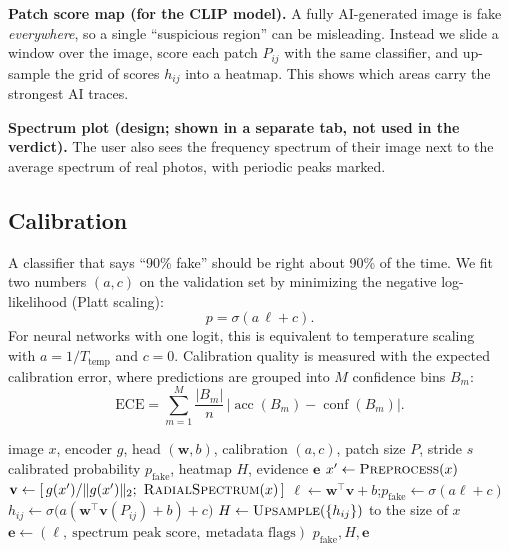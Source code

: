 \documentclass[11pt,a4paper]{article}
\begin{document}
\textbf{Patch score map (for the CLIP model).} A fully AI-generated image is fake
\emph{everywhere}, so a single ``suspicious region'' can be misleading. Instead we slide a window
over the image, score each patch $P_{ij}$ with the same classifier, and up-sample the grid of
scores $h_{ij}$ into a heatmap. This shows which areas carry the strongest AI traces.

\textbf{Spectrum plot (design; shown in a separate tab, not used in the verdict).} The user also sees the frequency spectrum of their image next to the
average spectrum of real photos, with periodic peaks marked.

\subsection{Calibration}
\label{sec:calibration}
A classifier that says ``90\% fake'' should be right about 90\% of the time. We fit two numbers
$(a,c)$ on the validation set by minimizing the negative log-likelihood (Platt scaling):
\begin{equation}
  p=\sigma(a\,\ell+c).
  \label{eq:platt}
\end{equation}
For neural networks with one logit, this is equivalent to temperature
scaling~\cite{guo} with $a=1/T_{\text{temp}}$ and $c=0$. Calibration quality is measured with the
expected calibration error, where predictions are grouped into $M$ confidence bins $B_m$:
\begin{equation}
  \text{ECE}=\sum_{m=1}^{M}\frac{\lvert B_m\rvert}{n}\,\bigl\lvert\operatorname{acc}(B_m)-\operatorname{conf}(B_m)\bigr\rvert .
  \label{eq:ece}
\end{equation}

\begin{algorithm}[htbp]
\caption{Image inference with explanation}
\label{alg:image-infer}
\begin{algorithmic}[1]
\Require image $x$, encoder $g$, head $(\mathbf{w},b)$, calibration $(a,c)$, patch size $P$, stride $s$
\Ensure calibrated probability $p_{\text{fake}}$, heatmap $H$, evidence $\mathbf{e}$
\State $x'\gets\textsc{Preprocess}(x)$
\State $\mathbf{v}\gets[\,g(x')/\lVert g(x')\rVert_2;\ \textsc{RadialSpectrum}(x)\,]$
\State $\ell\gets\mathbf{w}^{\top}\mathbf{v}+b$;\quad $p_{\text{fake}}\gets\sigma(a\ell+c)$
  \State $h_{ij}\gets\sigma\bigl(a(\mathbf{w}^{\top}\mathbf{v}(P_{ij})+b)+c\bigr)$ 
\EndFor
\State $H\gets\textsc{Upsample}(\{h_{ij}\})$ to the size of $x$
\State $\mathbf{e}\gets(\ell,\ \text{spectrum peak score},\ \text{metadata flags})$
\State \Return $p_{\text{fake}}, H, \mathbf{e}$
\end{algorithmic}
\end{algorithm}
\end{document}
